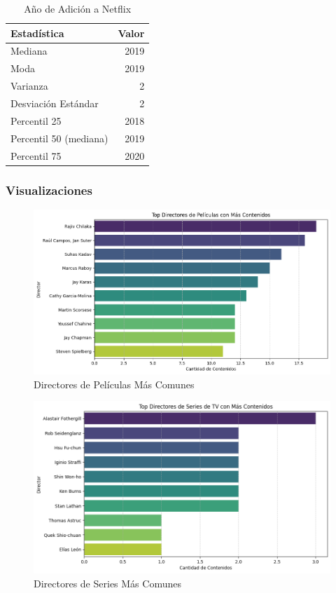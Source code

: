 \documentclass{article}
\begin{document}
\begin{table}[H]
    \centering
    \begin{tabular}{|l|r|}
    \hline
    \textbf{Estadística} & \textbf{Valor} \\
    \hline
    Mediana & 2019 \\
    Moda & 2019 \\
    Varianza & 2 \\
    Desviación Estándar & 2 \\
    Percentil 25 & 2018 \\
    Percentil 50 (mediana) & 2019 \\
    Percentil 75 & 2020 \\
    \hline
    \end{tabular}
    \caption{Año de Adición a  Netflix}
    \label{tab:estadisticas_adicion}
\end{table}
    \subsubsection{Visualizaciones}

\begin{figure}[H]
    \centering
    \includegraphics[width=\textwidth]{Graphs/directores_peliculas.png}
    \caption{Directores de Películas Más Comunes}
    \label{fig:peliculas_duracion}
\end{figure}

\begin{figure}[H]
    \centering
    \includegraphics[width=\textwidth]{Graphs/directores_series.png}
    \caption{Directores de Series Más Comunes}
    \label{fig:peliculas_duracion}
\end{figure}
\end{document}
